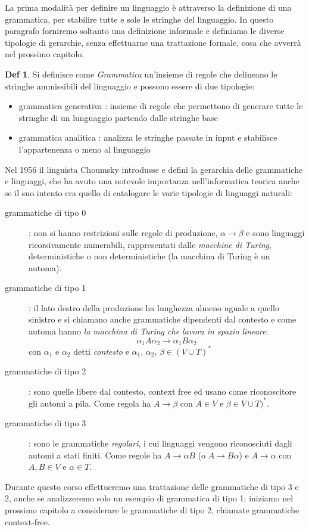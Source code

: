 \documentclass[a4paper]{book}
\theoremstyle{definition}%
\newtheorem*{defi}{Def}%
\begin{document}
La prima modalità per definire un linguaggio è attraverso la definizione di una grammatica, per stabilire tutte e sole
le stringhe del linguaggio.
In questo paragrafo forniremo soltanto una definizione informale e definiamo le diverse tipologie di gerarchie, senza
effettuarne una trattazione formale, cosa che avverrà nel prossimo capitolo.
\begin{defi}
    Si definisce come \emph{Grammatica} un'insieme di regole che delineano le stringhe ammissibili del linguaggio e
    possono essere di due tipologie:
    \begin{itemize}
      \item grammatica generativa : insieme di regole che permettono di generare tutte le stringhe di un lunguaggio partendo dalle stringhe base
      \item grammatica analitica : analizza le stringhe passate in input e stabilisce l'appartenenza o meno al linguaggio
    \end{itemize}
\end{defi}
  Nel 1956 il linguista Choumsky introdusse e definì la gerarchia delle grammatiche e linguaggi, che ha avuto una notevole importanza
  nell'informatica teorica anche se il suo intento era quello di catalogare le varie tipologie di linguaggi naturali:
\begin{description}
  \item [grammatiche di tipo 0]: non si hanno restrizioni sulle regole di produzione, $\alpha\to\beta$ e sono linguaggi ricorsivamente numerabili,
    rappresentati dalle \emph{macchine di Turing}, deterministiche o non deterministiche (la macchina di Turing è un automa).

  \item [grammatiche di tipo 1]:  il lato destro della produzione ha lunghezza almeno uguale a quello sinistro e si chiamano anche
        grammatiche dipendenti dal contesto e come automa hanno \emph{la macchina di Turing che lavora in spazio lineare}:
        \[ \alpha_1A\alpha_2\to \alpha_1B\alpha_2 \]
        con $\alpha_1$ e $\alpha_2$ detti \emph{contesto} e $\alpha_1,\,\alpha_2,\, \beta\in (V\cup T)^*$

  \item [grammatiche di tipo 2]: sono quelle libere dal contesto, context free ed usano come riconoscitore gli automi a pila.
        Come regola ha $A\to\beta$ con $A\in V$ e $\beta\in V\cup T)^*$.

  \item [grammatiche di tipo 3]: sono le grammatiche \emph{regolari}, i cui linguaggi vengono riconosciuti dagli automi a stati finiti.\newline
        Come regole ha $A\to\alpha B$ (o $A\to B\alpha$) e $A\to\alpha$  con $A,B\in V$ e $\alpha\in T$.
\end{description}
Durante questo corso effettueremo una trattazione delle grammatiche di tipo 3 e 2, anche se analizzeremo solo un esempio di grammatica di tipo 1;
iniziamo nel prossimo capitolo a considerare le grammatiche di tipo 2, chiamate grammatiche context-free.
\end{document}
